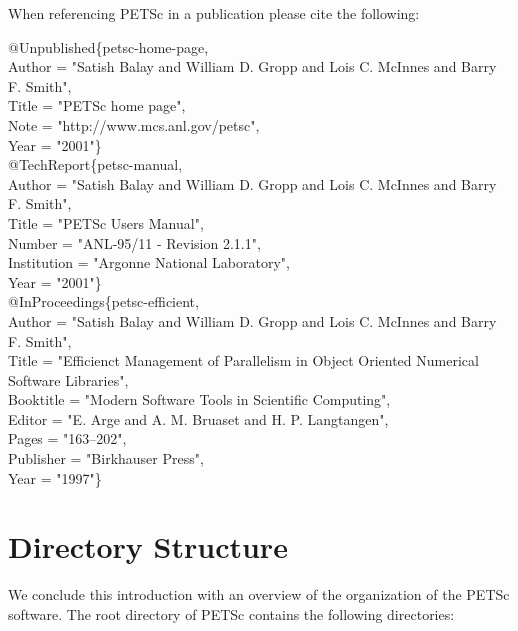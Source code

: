 When referencing PETSc in a publication please cite the following:
\begin{tabbing}
@Unpublished\{petsc-home-page,\\
   Author = "Satish Balay and William D. Gropp and Lois C. McInnes and Barry F. Smith",\\
   Title  = "PETSc home page",\\
   Note   = "http://www.mcs.anl.gov/petsc",\\
   Year   = "2001"\}\\

@TechReport\{petsc-manual,\\
   Author      = "Satish Balay and William D. Gropp and Lois C. McInnes and Barry F. Smith",\\
   Title       = "PETSc Users Manual",\\
   Number      = "ANL-95/11 - Revision 2.1.1",\\
   Institution = "Argonne National Laboratory",\\
   Year        = "2001"\}\\

@InProceedings\{petsc-efficient,\\
   Author    = "Satish Balay and William D. Gropp and Lois C. McInnes and Barry F. Smith",\\
   Title     = "Efficienct Management of Parallelism in Object Oriented Numerical Software Libraries",\\
   Booktitle = "Modern Software Tools in Scientific Computing",\\
   Editor    = "E. Arge and A. M. Bruaset and H. P. Langtangen",\\
   Pages     = "163--202",\\
   Publisher = "Birkhauser Press",\\
   Year      = "1997"\}
\end{tabbing}



\section{Directory Structure}

We conclude this introduction with an overview of the
organization of the PETSc software.  
The root directory of PETSc contains the following directories:

